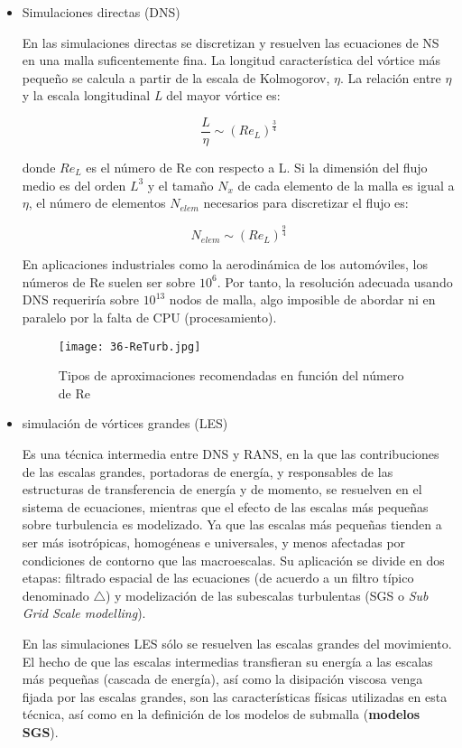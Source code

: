\begin{itemize}
\item
  Simulaciones directas (DNS)

  En las simulaciones directas se discretizan y resuelven las ecuaciones
  de NS en una malla suficentemente fina. La longitud característica del
  vórtice más pequeño se calcula a partir de la escala de Kolmogorov,
  \(\eta\). La relación entre \(\eta\) y la escala longitudinal \emph{L}
  del mayor vórtice es:

  \[\frac {L}{\eta} \sim (Re_L)^{\frac{3}{4}}\]

  donde \(Re_L\) es el número de Re con respecto a L. Si la dimensión
  del flujo medio es del orden \(L^3\) y el tamaño \(N_x\) de cada
  elemento de la malla es igual a \(\eta\), el número de elementos
  \(N_{elem}\) necesarios para discretizar el flujo es:

  \[N_{elem} \sim (Re_L)^{\frac{9}{4}}\]

  En aplicaciones industriales como la aerodinámica de los automóviles,
  los números de Re suelen ser sobre \(10^6\). Por tanto, la resolución
  adecuada usando DNS requeriría sobre \(10^{13}\) nodos de malla, algo
  imposible de abordar ni en paralelo por la falta de CPU
  (procesamiento).

  \begin{figure}
  \centering
  \texttt{[image: 36-ReTurb.jpg]}
  \caption{Tipos de aproximaciones recomendadas en función del número de Re}
  \end{figure}


\item
  simulación de vórtices grandes (LES)

  Es una técnica intermedia entre DNS y RANS, en la que las
  contribuciones de las escalas grandes, portadoras de energía, y
  responsables de las estructuras de transferencia de energía y de
  momento, se resuelven en el sistema de ecuaciones, mientras que el
  efecto de las escalas más pequeñas sobre turbulencia es modelizado. Ya
  que las escalas más pequeñas tienden a ser más isotrópicas, homogéneas
  e universales, y menos afectadas por condiciones de contorno que las
  macroescalas. Su aplicación se divide en dos etapas: filtrado espacial
  de las ecuaciones (de acuerdo a un filtro típico denominado
  \(\triangle\)) y modelización de las subescalas turbulentas (SGS o
  \emph{Sub Grid Scale modelling}).

  En las simulaciones LES sólo se resuelven las escalas grandes del
  movimiento. El hecho de que las escalas intermedias transfieran su
  energía a las escalas más pequeñas (cascada de energía), así como la
  disipación viscosa venga fijada por las escalas grandes, son las
  características físicas utilizadas en esta técnica, así como en la
  definición de los modelos de submalla (\textbf{modelos SGS}).


\end{itemize}
